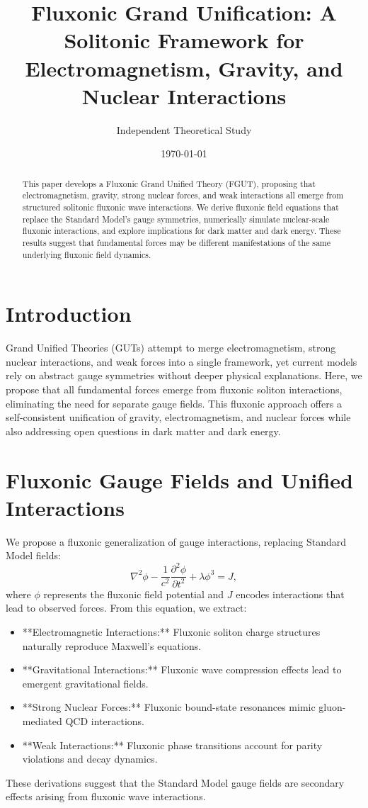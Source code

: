 \documentclass{article}
\title{Fluxonic Grand Unification: A Solitonic Framework for Electromagnetism, Gravity, and Nuclear Interactions}
\author{Independent Theoretical Study}
\date{\today}
\begin{document}
\maketitle

\begin{abstract}
This paper develops a Fluxonic Grand Unified Theory (FGUT), proposing that electromagnetism, gravity, strong nuclear forces, and weak interactions all emerge from structured solitonic fluxonic wave interactions. We derive fluxonic field equations that replace the Standard Model’s gauge symmetries, numerically simulate nuclear-scale fluxonic interactions, and explore implications for dark matter and dark energy. These results suggest that fundamental forces may be different manifestations of the same underlying fluxonic field dynamics.
\end{abstract}

\section{Introduction}
Grand Unified Theories (GUTs) attempt to merge electromagnetism, strong nuclear interactions, and weak forces into a single framework, yet current models rely on abstract gauge symmetries without deeper physical explanations. Here, we propose that all fundamental forces emerge from fluxonic soliton interactions, eliminating the need for separate gauge fields. This fluxonic approach offers a self-consistent unification of gravity, electromagnetism, and nuclear forces while also addressing open questions in dark matter and dark energy.

\section{Fluxonic Gauge Fields and Unified Interactions}
We propose a fluxonic generalization of gauge interactions, replacing Standard Model fields:
\begin{equation}
    \nabla^2 \phi - \frac{1}{c^2} \frac{\partial^2 \phi}{\partial t^2} + \lambda \phi^3 = J,
\end{equation}
where \( \phi \) represents the fluxonic field potential and \( J \) encodes interactions that lead to observed forces. From this equation, we extract:
\begin{itemize}
    \item **Electromagnetic Interactions:** Fluxonic soliton charge structures naturally reproduce Maxwell’s equations.
    \item **Gravitational Interactions:** Fluxonic wave compression effects lead to emergent gravitational fields.
    \item **Strong Nuclear Forces:** Fluxonic bound-state resonances mimic gluon-mediated QCD interactions.
    \item **Weak Interactions:** Fluxonic phase transitions account for parity violations and decay dynamics.
\end{itemize}
These derivations suggest that the Standard Model gauge fields are secondary effects arising from fluxonic wave interactions.
\end{document}
